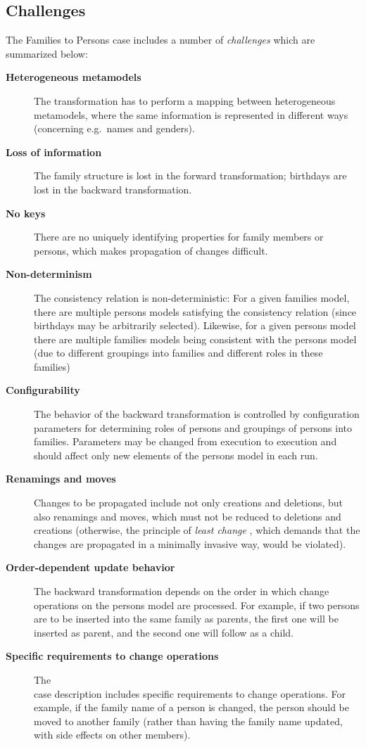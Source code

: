 \subsection{Challenges}
\label{sec:Challenges}

The Families to Persons case includes a number of \emph{challenges} which are summarized below:

\begin{description}
	\item[\textbf{Heterogeneous metamodels}] The transformation has to perform a mapping between heterogeneous metamodels, where the same information is represented in different ways (concerning e.g.\ names and genders).
	\item[\textbf{Loss of information}] The family structure is lost in the forward transformation; birthdays are lost in the backward transformation.
	\item[\textbf{No keys}] There are no uniquely identifying properties for family members or persons, which makes propagation of changes difficult.
	\item[\textbf{Non-determinism}] The consistency relation is non-deterministic: For a given families model, there are multiple persons models satisfying the consistency relation (since birthdays may be arbitrarily selected). Likewise, for a given persons model there are multiple families models being consistent with the persons model (due to different groupings into families and different roles in these families)
	\item[\textbf{Configurability}] The behavior of the backward transformation is controlled by configuration parameters for determining roles of persons and groupings of persons into families. Parameters may be changed from execution to execution and should affect only new elements of the persons model in each run.
	\item[\textbf{Renamings and moves}] Changes to be propagated include not only creations and deletions, but also renamings and moves, which must not be reduced to deletions and creations (otherwise, the principle of \emph{least change} \cite{SOSYM-Macedo2016}, which demands that the changes are propagated in a minimally invasive way, would be violated). 
	\item[\textbf{Order-dependent update behavior}] The backward transformation depends on the order in which change operations on the persons model are processed. For example, if two persons are to be inserted into the same family as parents, the first one will be inserted as parent, and the second one will follow as a child.
	\item[\textbf{Specific requirements to change operations}] The\\ case description includes specific requirements to change operations. For example, if the family name of a person is changed, the person should be moved to another family (rather than having the family name updated, with side effects on other members). 
\end{description}

